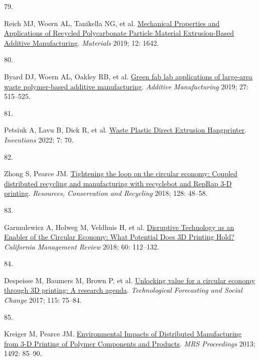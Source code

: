 \documentclass[
  11pt,
  a4paperpaper,
  onecolumn]{article}
\newlength{\cslhangindent}
\newlength{\csllabelwidth}
\newlength{\cslentryspacingunit} %
\newenvironment{CSLReferences}[2] %
 {%
  \setlength{\parindent}{0pt}
  \ifodd #1
  \let\oldpar\par
  \def\par{\hangindent=\cslhangindent\oldpar}
  \fi
  \setlength{\parskip}{#2\cslentryspacingunit}
 }%
 {}
\newcommand{\CSLLeftMargin}[1]{\parbox[t]{\csllabelwidth}{#1}}
\newcommand{\CSLRightInline}[1]{\parbox[t]{\linewidth - \csllabelwidth}{#1}\break}
\begin{document}
\begin{CSLReferences}{0}{0}
\leavevmode{}%
\CSLLeftMargin{79. }%
\CSLRightInline{Reich MJ, Woern AL, Tanikella NG, et al.
\href{https://doi.org/10.3390/ma12101642}{Mechanical {Properties} and
{Applications} of {Recycled Polycarbonate Particle Material
Extrusion-Based Additive Manufacturing}}. \emph{Materials} 2019; 12:
1642.}

\leavevmode{}%
\CSLLeftMargin{80. }%
\CSLRightInline{Byard DJ, Woern AL, Oakley RB, et al.
\href{https://doi.org/10.1016/j.addma.2019.03.006}{Green fab lab
applications of large-area waste polymer-based additive manufacturing}.
\emph{Additive Manufacturing} 2019; 27: 515--525.}

\leavevmode{}%
\CSLLeftMargin{81. }%
\CSLRightInline{Petsiuk A, Lavu B, Dick R, et al.
\href{https://doi.org/10.3390/inventions7030070}{Waste {Plastic Direct
Extrusion Hangprinter}}. \emph{Inventions} 2022; 7: 70.}

\leavevmode{}%
\CSLLeftMargin{82. }%
\CSLRightInline{Zhong S, Pearce JM.
\href{https://doi.org/10.1016/j.resconrec.2017.09.023}{Tightening the
loop on the circular economy: {Coupled} distributed recycling and
manufacturing with recyclebot and {RepRap} 3-{D} printing}.
\emph{Resources, Conservation and Recycling} 2018; 128: 48--58.}

\leavevmode{}%
\CSLLeftMargin{83. }%
\CSLRightInline{Garmulewicz A, Holweg M, Veldhuis H, et al.
\href{https://doi.org/10.1177/0008125617752695}{Disruptive {Technology}
as an {Enabler} of the {Circular Economy}: {What Potential Does 3D
Printing Hold}?} \emph{California Management Review} 2018; 60:
112--132.}

\leavevmode{}%
\CSLLeftMargin{84. }%
\CSLRightInline{Despeisse M, Baumers M, Brown P, et al.
\href{https://doi.org/10.1016/j.techfore.2016.09.021}{Unlocking value
for a circular economy through {3D} printing: {A} research agenda}.
\emph{Technological Forecasting and Social Change} 2017; 115: 75--84.}

\leavevmode{}%
\CSLLeftMargin{85. }%
\CSLRightInline{Kreiger M, Pearce JM.
\href{https://doi.org/10.1557/opl.2013.319}{Environmental {Impacts} of
{Distributed Manufacturing} from 3-{D Printing} of {Polymer Components}
and {Products}}. \emph{MRS Proceedings} 2013; 1492: 85--90.}


\end{CSLReferences}
\end{document}
